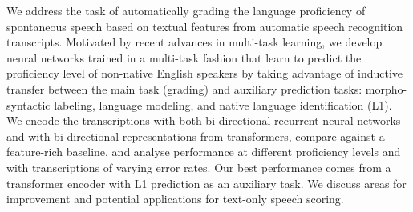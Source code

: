 We address the task of automatically grading the language proficiency of spontaneous speech based on textual features from automatic speech recognition transcripts. Motivated by recent advances in multi-task learning, we develop neural networks trained in a multi-task fashion that learn to predict the proficiency level of non-native English speakers by taking advantage of inductive transfer between the main task (grading) and auxiliary prediction tasks: morpho-syntactic labeling, language modeling, and native language identification (L1). We encode the transcriptions with both bi-directional recurrent neural networks and with bi-directional representations from transformers, compare against a feature-rich baseline, and analyse performance at different proficiency levels and with transcriptions of varying error rates. Our best performance comes from a transformer encoder with L1 prediction as an auxiliary task. We discuss areas for improvement and potential applications for text-only speech scoring.
